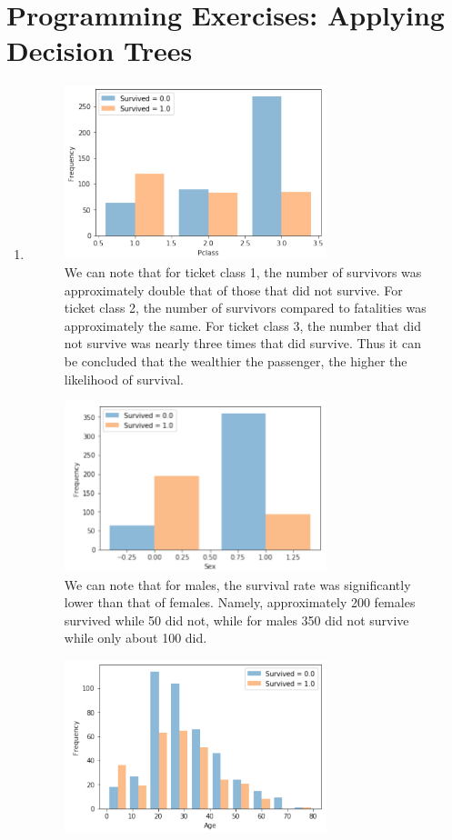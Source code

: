 \documentclass[11pt]{article}
\newcommand{\solution}[1]{{{\color{blue}{\bf Solution:} {#1}}}}
\begin{document}
\section{Programming Exercises: Applying Decision Trees}
\begin{enumerate}
\item
\solution{
\begin{figure}[!htbp]
    \centering
    \includegraphics[width=3in]{5a-ticket.png}
    \caption{We can note that for ticket class 1, the number of survivors was approximately double that of those that did not survive. For ticket class 2, the number of survivors compared to fatalities was approximately the same. For ticket class 3, the number that did not survive was nearly three times that did survive. Thus it can be concluded that the wealthier the passenger, the higher the likelihood of survival.}
\end{figure}
\begin{figure}[!htbp]
    \centering
    \includegraphics[width=3in]{5a-sex.png}
    \caption{We can note that for males, the survival rate was significantly lower than that of females. Namely, approximately 200 females survived while 50 did not, while for males 350 did not survive while only about 100 did.}
\end{figure}
\begin{figure}[!htbp]
    \centering
    \includegraphics[width=3in]{5a-age.png}

\end{figure}}
\end{enumerate}
\end{document}
